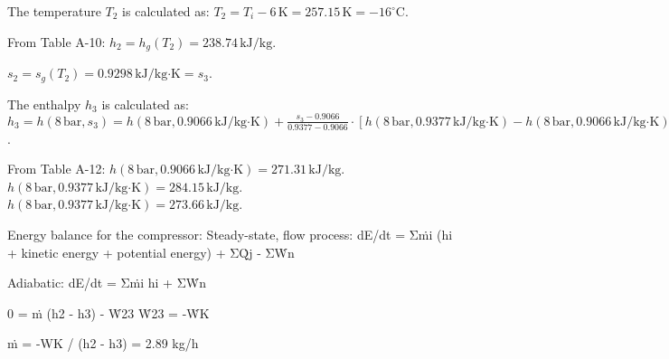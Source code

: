 The temperature \( T_2 \) is calculated as:  
\( T_2 = T_i - 6 \, \text{K} = 257.15 \, \text{K} = -16^\circ \text{C} \).  

From Table A-10:  
\( h_2 = h_{g}(T_2) = 238.74 \, \text{kJ/kg} \).  

\( s_2 = s_{g}(T_2) = 0.9298 \, \text{kJ/kg·K} = s_3 \).  

The enthalpy \( h_3 \) is calculated as:  
\( h_3 = h(8 \, \text{bar}, s_3) = h(8 \, \text{bar}, 0.9066 \, \text{kJ/kg·K}) + \frac{s_3 - 0.9066}{0.9377 - 0.9066} \cdot \left[ h(8 \, \text{bar}, 0.9377 \, \text{kJ/kg·K}) - h(8 \, \text{bar}, 0.9066 \, \text{kJ/kg·K}) \right] \).  

From Table A-12:  
\( h(8 \, \text{bar}, 0.9066 \, \text{kJ/kg·K}) = 271.31 \, \text{kJ/kg} \).  
\( h(8 \, \text{bar}, 0.9377 \, \text{kJ/kg·K}) = 284.15 \, \text{kJ/kg} \).  
\( h(8 \, \text{bar}, 0.9377 \, \text{kJ/kg·K}) = 273.66 \, \text{kJ/kg} \).

Energy balance for the compressor:  
Steady-state, flow process:  
dE/dt = Σṁi (hi + kinetic energy + potential energy) + ΣQ̇j - ΣẆn  

Adiabatic:  
dE/dt = Σṁi hi + ΣẆn  

0 = ṁ (h2 - h3) - Ẇ23  
Ẇ23 = -ẆK  

ṁ = -WK / (h2 - h3) = 2.89 kg/h